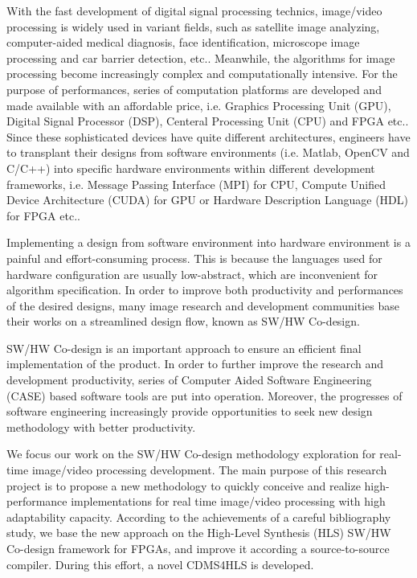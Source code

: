 \documentclass[10pt,twocolumn,letterpaper]{article}
\begin{document}
With the fast development of digital signal processing technics, image/video processing is widely used in variant fields, such as satellite image analyzing, computer-aided medical diagnosis, face identification, microscope image processing and car barrier detection, etc.. Meanwhile, the algorithms for image processing become increasingly complex and computationally intensive. For the purpose of performances, series of computation platforms are developed and made available with an affordable price, i.e. Graphics Processing Unit (GPU), Digital Signal Processor (DSP), Centeral Processing Unit (CPU) and FPGA etc.. Since these sophisticated devices have quite different architectures, engineers have to transplant their designs from software environments (i.e. Matlab, OpenCV and C/C++) into specific hardware environments within different development frameworks, i.e. Message Passing Interface (MPI) for CPU, Compute Unified Device Architecture (CUDA) for GPU or Hardware Description Language (HDL) for FPGA etc..

Implementing a design from software environment into hardware environment is a painful and effort-consuming process. This is because the languages used for hardware configuration are usually low-abstract, which are inconvenient for algorithm specification. In order to improve both productivity and performances of the desired designs, many image research and development communities base their works on a streamlined design flow, known as SW/HW Co-design.

SW/HW Co-design is an important approach to ensure an efficient final implementation of the product. In order to further improve the research and development productivity, series of Computer Aided Software Engineering (CASE) based software
tools are put into operation. Moreover, the progresses of software engineering increasingly provide opportunities to seek new design methodology with better productivity.

We focus our work on the SW/HW Co-design methodology exploration for real-time image/video processing development. The main purpose of this research project is to propose a new methodology to quickly conceive and realize high-performance implementations for real time image/video processing with high adaptability capacity. According to the achievements of a careful bibliography study, we base the new approach on the High-Level Synthesis (HLS) SW/HW Co-design framework for FPGAs, and improve it according a source-to-source compiler. During this effort, a novel CDMS4HLS is developed.
\end{document}
